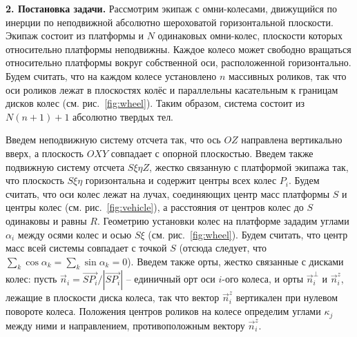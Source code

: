 {\bf 2. Постановка задачи.}
Рассмотрим экипаж с омни-колесами, движущийся по инерции по неподвижной абсолютно шероховатой горизонтальной плоскости. Экипаж состоит из платформы и $N$ одинаковых омни-колес, плоскости которых относительно платформы неподвижны. Каждое колесо может свободно вращаться относительно платформы вокруг собственной оси, расположенной горизонтально. Будем считать, что на каждом колесе установлено $n$ массивных роликов, так что оси роликов лежат в плоскостях колёс и параллельны касательным к границам дисков колес (см. рис.~\ref{fig:wheel}). Таким образом, система состоит из $N(n+1) + 1$ абсолютно твердых тел. 



Введем неподвижную систему отсчета так, что ось $OZ$ направлена вертикально вверх, а плоскость $OXY$ совпадает с опорной плоскостью.
Введем также подвижную систему отсчета $S\xi\eta Z$, жестко связанную с платформой экипажа так, что плоскость $S\xi\eta$ горизонтальна и содержит центры всех колес $P_i$. Будем считать, что оси колес лежат на лучах, соединяющих центр масс платформы $S$ и центры колес (см. рис.~\ref{fig:vehicle}), а расстояния от центров колес до $S$ одинаковы и равны $R$. Геометрию установки колес на платформе зададим углами $\alpha_i$ между осями колес и осью $S\xi$
(см. рис.~\ref{fig:wheel}). Будем считать, что центр масс всей системы совпадает с точкой $S$ (отсюда следует, что $\sum_k \cos\alpha_k = \sum_k\sin\alpha_k = 0$). Введем также орты, жестко связанные с дисками колес: пусть $\vec{n}_i = \vec{SP_i}/|\vec{SP_i}|$ -- единичный орт оси $i$-ого колеса, и орты $\vec{n}_i^\perp$ и $\vec{n}_i^z$, лежащие в плоскости диска колеса, так что вектор $\vec{n}_i^z$ вертикален при нулевом повороте колеса. Положения центров роликов на колесе определим углами $\kappa_j$ между ними и направлением, противоположным вектору $\vec{n}_i^z$. 

